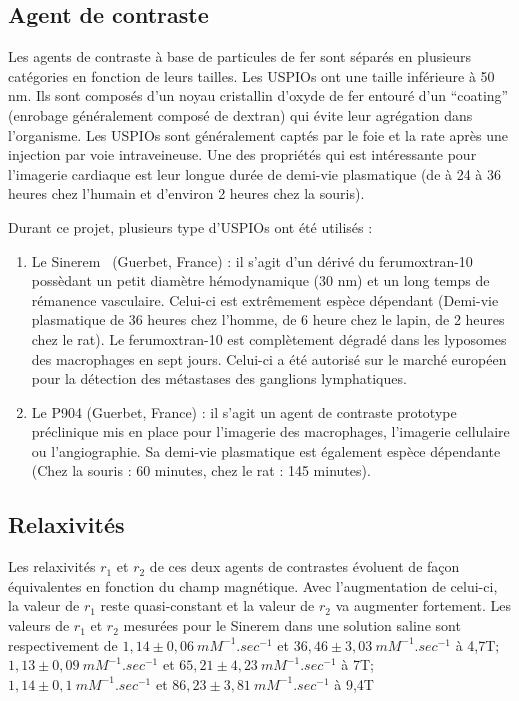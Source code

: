 \subsection{Agent de contraste}

Les agents de contraste à base de particules de fer sont séparés en plusieurs catégories en fonction de leurs tailles. Les USPIOs ont une taille inférieure à 50 nm. Ils sont composés d’un noyau cristallin d’oxyde de fer entouré d’un “coating” (enrobage généralement composé de dextran) qui évite leur agrégation dans l’organisme. Les USPIOs sont généralement captés par le foie et la rate après une injection par voie intraveineuse. Une des propriétés qui est intéressante pour l'imagerie cardiaque est leur longue durée de demi-vie plasmatique (de à 24 à 36 heures chez l'humain et d'environ 2 heures chez la souris).

Durant ce projet, plusieurs type d'USPIOs ont été utilisés : 
\begin{enumerate}
\item Le Sinerem \textregistered \ (Guerbet, France) : il s'agit d'un dérivé du ferumoxtran-10 possèdant un petit diamètre hémodynamique (30 nm) et un long temps de rémanence vasculaire. Celui-ci est extrêmement espèce dépendant (Demi-vie plasmatique de 36 heures chez l'homme, de 6 heure chez le lapin, de 2 heures chez le rat). Le ferumoxtran-10 est complètement dégradé dans les lyposomes des macrophages en sept jours. Celui-ci a été autorisé sur le marché européen pour la détection des métastases des ganglions lymphatiques.

\item Le P904 (Guerbet, France) : il s'agit un agent de contraste prototype préclinique mis en place pour l'imagerie des macrophages, l'imagerie cellulaire ou l'angiographie. Sa demi-vie plasmatique est également espèce dépendante (Chez la souris : 60 minutes, chez le rat : 145 minutes).
\end{enumerate}

\subsection{Relaxivités}

Les relaxivités $r_1$ et $r_2$ de ces deux agents de contrastes évoluent de façon équivalentes en fonction du champ magnétique. Avec l'augmentation de celui-ci, la valeur de $r_1$ reste quasi-constant et la valeur de $r_2$ va augmenter fortement. Les valeurs de $r_1$ et $r_2$ mesurées pour le Sinerem dans une solution saline sont respectivement de $1,14 \pm 0,06 \ mM^{-1}.sec^{-1}$ et $36,46 \pm 3,03 \ mM^{-1}.sec^{-1}$ à 4,7T; $1,13 \pm 0,09 \ mM^{-1}.sec^{-1}$ et $65,21 \pm 4,23 \ mM^{-1}.sec^{-1}$ à 7T; $1,14 \pm 0,1 \ mM^{-1}.sec^{-1}$ et $86,23 \pm 3,81 \ mM^{-1}.sec^{-1}$ à 9,4T


